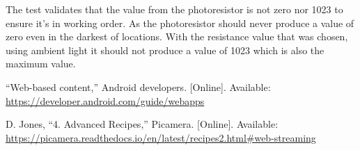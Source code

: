 \documentclass[letterpaper,12pt]{report}
\begin{document}
    The test validates that the value from the photoresistor is not zero nor
    1023 to ensure it’s in working order. As the photoresistor should never
    produce a value of zero even in the darkest of locations. With the
    resistance value that was chosen, using ambient light it should not produce
    a value of 1023 which is also the maximum value.

    \begin{thebibliography}{9}
        “Web-based content,” Android developers. [Online]. Available:
        \\\url{https://developer.android.com/guide/webapps}

        D. Jones, “4. Advanced Recipes,” Picamera. [Online]. Available:
        \\\url{https://picamera.readthedocs.io/en/latest/recipes2.html#web-streaming}
    \end{thebibliography}
\end{document}
